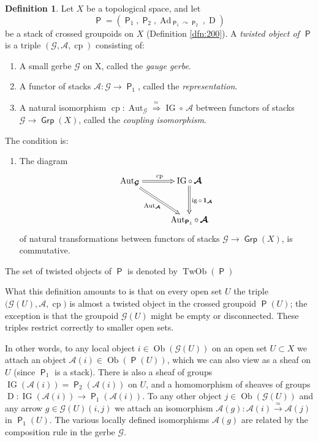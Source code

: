 \documentclass[a4paper, 10pt]{amsart}
\theoremstyle{definition}
\newtheorem{dfn}[equation]{Definition}
\numberwithin{equation}{section}
\newcommand{\iso}{\xrightarrow{\simeq}}
\newcommand{\opn}{\operatorname}
\newcommand{\cat}[1]{\operatorname{\mathsf{#1}}}
\newcommand{\rmitem}[1]{\item[\text{\textup{(#1)}}]}
\newcommand{\mcal}[1]{\mathcal{#1}}
\newcommand{\bsym}[1]{\boldsymbol{#1}}
\newcommand{\twoiso}{\stackrel{\simeq\ }{\Longrightarrow}}
\newcommand{\gerbe}[1]{\bsym{\mcal{#1}}}
\newcommand{\twocat}[1]{\operatorname{\bsym{\cat{#1}}}}
\newcommand{\crvar}{\curvearrowright}
\begin{document}
\begin{dfn} \label{dfn:11}
Let $X$ be a topological space, and let
\[ \twocat{P} = ( \twocat{P}_1, \twocat{P}_2, 
\opn{Ad}_{\twocat{P}_1 \crvar \twocat{P}_{2}}, \opn{D} ) \]
be a stack of crossed groupoids on $X$ (Definition \ref{dfn:200}). 
A {\em twisted object of $\twocat{P}$} is a triple 
$(\gerbe{G}, \gerbe{A}, \opn{cp})$ consisting of:
\begin{enumerate}
\item A small gerbe $\gerbe{G}$ on X, called the
{\em gauge gerbe}.
\item A functor of stacks
$\gerbe{A} : \gerbe{G} \to \twocat{P}_1$, called the {\em representation}.
\item A natural isomorphism
$\opn{cp} : \opn{Aut}_{\gerbe{G}} \twoiso \opn{IG} \circ \, \gerbe{A}$
between functors of stacks $\gerbe{G} \to \twocat{Grp}(X)$, 
called the {\em coupling isomorphism}.
\end{enumerate} 
The condition is: 
\begin{enumerate}
\rmitem{$*$} The diagram 
\[ \UseTips \xymatrix @C=7ex @R=7ex {
\opn{Aut}_{\gerbe{G}}
\ar@{=>}[r]^{\opn{cp}}
\ar@{=>}[dr]_{\opn{Aut}_{\gerbe{A}}}
& \opn{IG} \circ \, \gerbe{A}
\ar@{=>}[d]^{\opn{ig} \circ \, \bsym{1}_{\gerbe{A}}} \\
& \opn{Aut}_{\twocat{P}_1} \circ \, \gerbe{A}
}  \]
of natural transformations
between functors of stacks $\gerbe{G} \to \twocat{Grp}(X)$, is
commutative. 
\end{enumerate}

The set of twisted objects of $\twocat{P}$ is denoted by
$\opn{TwOb}(\twocat{P})$
\end{dfn}

What this definition amounts to is that on every open set $U$
the triple \linebreak
$\bigl( \gerbe{G}(U), \gerbe{A}, \opn{cp} \bigr)$
is almost a twisted object in the crossed groupoid $\twocat{P}(U)$; 
the exception is that the groupoid $\gerbe{G}(U)$ might be empty or
disconnected. These triples restrict correctly to smaller open sets.

In other words, to any local object
$i \in \opn{Ob} (\gerbe{G}(U))$ on an open set $U \subset X$
we attach an object $\gerbe{A}(i) \in \opn{Ob} (\twocat{P}(U))$, 
which we can also view as a sheaf on $U$ (since $\twocat{P}_1$ is a
stack). There is also a sheaf of groups 
$\opn{IG}(\gerbe{A}(i)) = \twocat{P}_2(\gerbe{A}(i))$ on $U$, 
and a homomorphism of sheaves of groups
$\opn{D} : \opn{IG}(\gerbe{A}(i)) \to \twocat{P}_1(\gerbe{A}(i))$.
To any other object $j \in \opn{Ob} (\gerbe{G}(U))$ and any
arrow $g \in \gerbe{G}(U)(i, j)$ we attach an isomorphism
$\gerbe{A}(g) : \gerbe{A}(i) \iso \gerbe{A}(j)$
in $\twocat{P}_1(U)$.
The various locally defined isomorphisms $\gerbe{A}(g)$ are
related by the composition rule in the gerbe $\gerbe{G}$.
\end{document}
